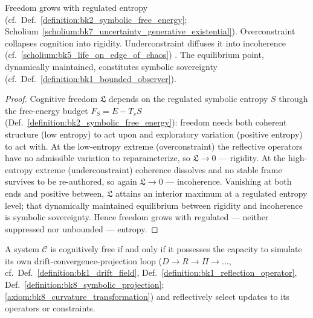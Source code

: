 \begin{corollary}
\label{corollary:bk9_freedomentropy_complementarity}
Freedom grows with regulated entropy (cf.~Def.~\ref{definition:bk2_symbolic_free_energy}; Scholium~\ref{scholium:bk7_uncertainty_generative_existential}). Overconstraint collapses cognition into rigidity. Underconstraint diffuses it into incoherence (cf.~\ref{scholium:bk5_life_on_edge_of_chaos})
\label{axiom:bk9_drift_entropy_coherence_limit}. The equilibrium point, dynamically maintained, constitutes symbolic sovereignty (cf.~Def.~\ref{definition:bk1_bounded_observer}).
\end{corollary}
\begin{proof}
\label{proof:bk9_freedomentropy_complementarity}
\leavevmode
Cognitive freedom $\mathfrak{L}$ depends on the regulated symbolic entropy $S$ through the free-energy budget $F_S=E-T_sS$ (Def.~\ref{definition:bk2_symbolic_free_energy}): freedom needs both coherent structure (low entropy) to act upon and exploratory variation (positive entropy) to act with. At the low-entropy extreme (overconstraint) the reflective operators have no admissible variation to reparameterize, so $\mathfrak{L}\to0$ --- rigidity. At the high-entropy extreme (underconstraint) coherence dissolves and no stable frame survives to be re-authored, so again $\mathfrak{L}\to0$ --- incoherence. Vanishing at both ends and positive between, $\mathfrak{L}$ attains an interior maximum at a regulated entropy level; that dynamically maintained equilibrium between rigidity and incoherence is symbolic sovereignty. Hence freedom grows with regulated --- neither suppressed nor unbounded --- entropy.
\end{proof}
\begin{corollary}
\label{corollary:bk9_selfreferential_capacity}
A system $\mathcal{C}$ is cognitively free if and only if it possesses the capacity to simulate its own drift-convergence-projection loop ($D \to R \to \Pi \to \dots$, cf.~Def.~\ref{definition:bk1_drift_field}, Def.~\ref{definition:bk1_reflection_operator}, Def.~\ref{definition:bk8_symbolic_projection}; \ref{axiom:bk8_curvature_transformation}) and reflectively select updates to its operators or constraints.
\end{corollary}
